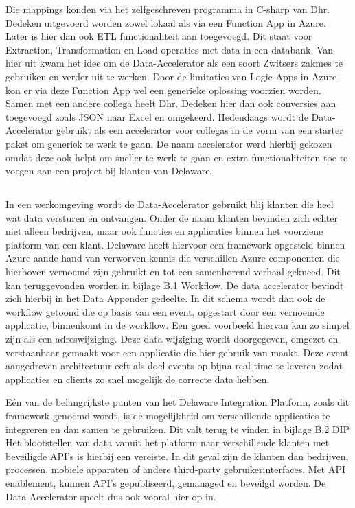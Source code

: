 Die mappings konden via het zelfgeschreven programma in C-sharp van Dhr. Dedeken uitgevoerd worden zowel lokaal als via een Function App in Azure. Later is hier dan ook ETL functionaliteit aan toegevoegd. Dit staat voor Extraction, Transformation en Load operaties met data in een databank. Van hier uit kwam het idee om de Data-Accelerator als een soort Zwitsers zakmes te gebruiken en verder uit te werken. Door de limitaties van Logic Apps in Azure kon er via deze Function App wel een generieke oplossing voorzien worden. Samen met een andere collega heeft Dhr. Dedeken hier dan ook conversies aan toegevoegd zoals JSON naar Excel en omgekeerd. Hedendaags wordt de Data-Accelerator gebruikt als een accelerator voor collegas in de vorm van een starter paket om generiek te werk te gaan. De naam accelerator werd hierbij gekozen omdat deze ook helpt om sneller te werk te gaan en extra functionaliteiten toe te voegen aan een project bij klanten van Delaware.\autocite{LopezNovoa2015}

\subsection{}%
\label{sec:Werkomgeving}

In een werkomgeving wordt de Data-Accelerator gebruikt blij klanten die heel wat data versturen en ontvangen. Onder de naam klanten bevinden zich echter niet alleen bedrijven, maar ook functies en applicaties binnen het voorziene platform van een klant. Delaware heeft hiervoor een framework opgesteld binnen Azure aande hand van verworven kennis die verschillen Azure componenten die hierboven vernoemd zijn gebruikt en tot een samenhorend verhaal gekneed. Dit kan teruggevonden worden in bijlage B.1 Workflow. De data accelerator bevindt zich hierbij in het Data Appender gedeelte. In dit schema wordt dan ook de workflow getoond die op basis van een event, opgestart door een vernoemde applicatie, binnenkomt in de workflow. Een goed voorbeeld hiervan kan zo simpel zijn als een adreswijziging. Deze data wijziging wordt doorgegeven, omgezet en verstaanbaar gemaakt voor een applicatie die hier gebruik van maakt. Deze event aangedreven architectuur eeft als doel events op bijna real-time te leveren zodat applicaties en clients zo snel mogelijk de correcte data hebben.

Eén van de belangrijkste punten van het Delaware Integration Platform, zoals dit framework genoemd wordt, is de mogelijkheid om verschillende applicaties te integreren en dan samen te gebruiken. Dit valt terug te vinden in bijlage B.2 DIP Het blootstellen van data vanuit het platform naar verschillende klanten met beveiligde API's is hierbij een vereiste. In dit geval zijn de klanten dan bedrijven, processen, mobiele apparaten of andere third-party gebruikerinterfaces. Met API enablement, kunnen API's gepubliseerd, gemanaged en beveilgd worden. De Data-Accelerator speelt dus ook vooral hier op in.

